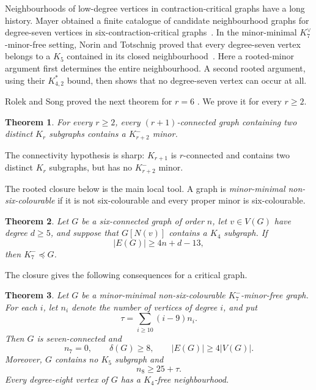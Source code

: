\documentclass[11pt]{amsart}
\newtheorem{theorem}{Theorem}[section]
\newcommand{\minor}{\preccurlyeq}
\begin{document}
Neighbourhoods of low-degree vertices in contraction-critical graphs have
a long history.  Mayer obtained a finite catalogue of candidate
neighbourhood graphs for degree-seven vertices in six-contraction-critical
graphs~\cite{Mayer1993}.  In the minor-minimal
$K_7^{\vee}$-minor-free setting, Norin and Totschnig proved that every
degree-seven vertex belongs to a $K_5$ contained in its closed
neighbourhood~\cite[Claim~4.4]{NorinTotschnig2025}.  Here a rooted-minor
argument first determines the entire neighbourhood.  A second rooted
argument, using their $K^*_{4,2}$ bound, then shows that no
degree-seven vertex can occur at all.

Rolek and Song proved the next theorem for $r=6$
\cite[Lemma~1.9]{RolekSong2017}.  We prove it for every $r\geq2$.

\begin{theorem}\label{thm:two-cliques-intro}
For every $r\geq2$, every $(r+1)$-connected graph containing two distinct
$K_r$ subgraphs contains a $K_{r+2}^{-}$ minor.
\end{theorem}

The connectivity hypothesis is sharp:
$K_{r+1}$ is $r$-connected and contains two distinct $K_r$ subgraphs, but
has no $K_{r+2}^{-}$ minor.

The rooted closure below is the main local tool.  A graph is
\emph{minor-minimal non-six-colourable} if it is not six-colourable and
every proper minor is six-colourable.

\begin{theorem}\label{thm:rooted-helper-intro}
Let $G$ be a six-connected graph of order $n$, let $v\in V(G)$ have degree
$d\geq5$, and suppose that $G[N(v)]$ contains a $K_4$ subgraph.  If
\[
        |E(G)|\geq4n+d-13,
\]
then $K_7^{-}\minor G$.
\end{theorem}

The closure gives the following consequences for a critical graph.

\begin{theorem}\label{thm:package-intro}
Let $G$ be a minor-minimal non-six-colourable $K_7^{-}$-minor-free graph.
For each $i$, let $n_i$ denote the number of vertices of degree $i$, and put
\[
        \tau=\sum_{i\geq10}(i-9)n_i.
\]
Then $G$ is seven-connected and
\[
        n_7=0,
        \qquad \delta(G)\geq8,
        \qquad |E(G)|\geq4|V(G)|.
\]
Moreover, $G$ contains no $K_5$ subgraph and
\[
        n_8\geq25+\tau.
\]
Every degree-eight vertex of $G$ has a $K_4$-free neighbourhood.
\end{theorem}
\end{document}
